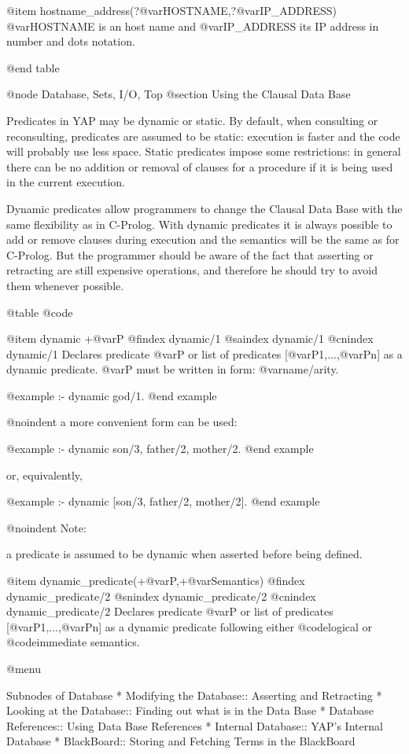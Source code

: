{{{{{{@item hostname_address(?@var{HOSTNAME},?@var{IP_ADDRESS})
@var{HOSTNAME} is an host name and @var{IP_ADDRESS} its IP
address in number and dots notation.


@end table

@node Database, Sets, I/O, Top
@section Using the Clausal Data Base

Predicates in YAP may be dynamic or static. By default, when
consulting or reconsulting, predicates are assumed to be static:
execution is faster and the code will probably use less space.
Static predicates impose some restrictions: in general there can be no 
addition or removal of  clauses for a procedure if it is being used in the
current execution.

Dynamic predicates allow programmers to change the Clausal Data Base with
the same flexibility as in C-Prolog. With dynamic predicates it is
always possible to add or remove clauses during execution and the
semantics will be the same as for C-Prolog. But the programmer should be
aware of the fact that asserting or retracting are still expensive operations, 
and therefore he should try to avoid them whenever possible.

@table @code

@item dynamic +@var{P}
@findex dynamic/1
@saindex dynamic/1
@cnindex dynamic/1
Declares predicate @var{P} or list of predicates [@var{P1},...,@var{Pn}]
as a dynamic predicate. @var{P} must be written in form:
@var{name/arity}.

@example
:- dynamic god/1.
@end example

@noindent 
a more convenient form can be used:

@example
:- dynamic son/3, father/2, mother/2.
@end example

or, equivalently,

@example
:- dynamic [son/3, father/2, mother/2].
@end example

@noindent
Note:

a predicate is assumed to be dynamic when 
asserted before being defined.

@item dynamic_predicate(+@var{P},+@var{Semantics})
@findex dynamic_predicate/2
@snindex dynamic_predicate/2
@cnindex dynamic_predicate/2
Declares predicate @var{P} or list of predicates [@var{P1},...,@var{Pn}]
as a dynamic predicate following either @code{logical} or
@code{immediate} semantics.

@menu

Subnodes of Database
* Modifying the Database:: Asserting and Retracting
* Looking at the Database:: Finding out what is in the Data Base
* Database References:: Using Data Base References
* Internal Database:: YAP's Internal Database
* BlackBoard:: Storing and Fetching Terms in the BlackBoard

}}}}}}
